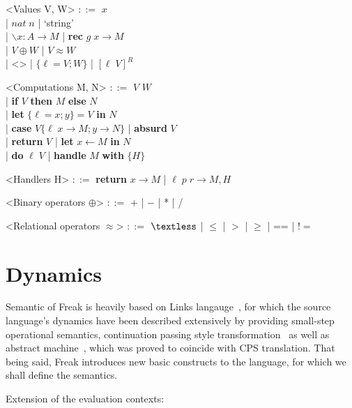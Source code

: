\documentclass[declaration,shortabstract]{iithesis}
\theoremstyle{definition} \newtheorem{definition}{Definition}[chapter]
\theoremstyle{remark} \newtheorem{remark}[definition]{Observation}
\theoremstyle{plain} \newtheorem{theorem}[definition]{Theorem}
\theoremstyle{plain} \newtheorem{lemma}[definition]{Lemma}
\begin{document}
    \begin{grammar}

        <Values V, W> $::=$ $ x $ \\
            | $nat \; n$ | `string'  \\
            | $ \backslash x : A \rightarrow M $ | \textbf{rec} $ g \; x \rightarrow M $\\
            | $V \oplus W$ | $V \approx W$ \\
            | <> | $ \{ \ell = V; W\} $  | ${[ \ell \; V]}^{R}$

        <Computations M, N> $::=$ $ V $ $ W $ \\
            | \textbf{if} $V$ \textbf{then} $M$ \textbf{else} $N$ \\
            | \textbf{let} $\{\ell  = x; y\} = V$ \textbf{in} $ N $ \\
            | \textbf{case} $V \{ \ell \; x \rightarrow M; y \rightarrow N\}$ | \textbf{absurd} $ V $ \\
            | \textbf{return} $V$ | \textbf{let} $ x \leftarrow M $ \textbf{in} $ N $ \\
            | \textbf{do} $\ell \; V$ | \textbf{handle} $M$ \textbf{with} $ \{ H \} $

        <Handlers H> $::=$ \textbf{return} $ x \rightarrow M $ | $ \ell \; p \; r \rightarrow M, H $

        <Binary operators $\oplus$> $::=$ + | $-$ | * | /

        <Relational operators $\approx$> $::=$ $ \textless $ | $\leqslant$ | $>$ | $\geqslant$ | == | $!= $

    \end{grammar}

\section{Dynamics}

    Semantic of Freak is heavily based on Links langauge~\cite{handlers-cps-journal},
    for which the source language's dynamics have been described extensively by
    providing small-step operational semantics, continuation passing style
    transformation~\cite{handlers-cps} as well as abstract
    machine~\cite{liberating-effects}, which was proved to coincide with CPS
    translation. That being said, Freak introduces new basic constructs to the
    language, for which we shall define the semantics.

    \noindent
    Extension of the evaluation contexts:
\end{document}
